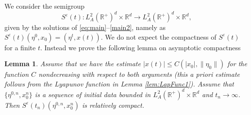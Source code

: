 \documentclass[11pt, leqno]{amsart}
\newtheorem{lem}[thm]{Lemma}
\theoremstyle{definition}
\def\R{\mathbb{R}}
\begin{document}
We consider  the semigroup
$$
S^\varepsilon(t):L^2_A(\R^+)^d\times \R^d   \to L^2_A(\R^+)^d\times \R^d,
$$
given by the solutions of \eqref{eq:main}--\eqref{main2}, namely
as $S^\varepsilon(t)(\eta^0,x_0) = (\eta^t,x(t))$. We do not expect the compactness of $S^\varepsilon(t)$ for a finite $t$. Instead we prove the following lemma on asymptotic compactness
\begin{lem}\label{lemma:compact}
Assume that we have the estimate $|x(t)|\leq C(|x_0|, \|\eta_0\|)$ for the function $C$ nondecreasing with respect to both  arguments (this a priori estimate follows from the Lyapunov function in Lemma \ref{lem:LapFunc1}).
	Assume that $\{\eta^{0,n},x_0^n\}$ is a sequence of initial data bounded in $L^2_A(\R^+)^d\times \R^d$ and $t_n\to \infty$. Then $S^\varepsilon(t_n)( \eta^{0,n},x_0^n)$ is relatively compact.
	\end{lem}
\end{document}
